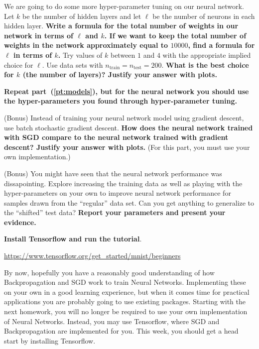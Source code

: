 \begin{Parts}
\Part We are going to do some more hyper-parameter tuning on our neural network. Let $k$ be the number of hidden layers and let $\ell$ be the number of neurons in each hidden layer. \textbf{Write a formula for the total number of weights in our network in terms of $\ell$ and $k$. If we want to keep the total number of weights in the network approximately equal to $10000$, find a formula for $\ell$ in terms of $k$.} Try values of $k$ between $1$ and $4$ with the appropriate implied choice for $\ell$. Use data sets with $n_\text{train}=n_\text{test}=200$. \textbf{What is the best choice for $k$ (the number of layers)? Justify your answer with plots.}



\Part \textbf{Repeat part~(\ref{pt:models}), but for the neural network you should use the hyper-parameters you found through hyper-parameter tuning.}



\Part (Bonus) Instead of training your neural network model using
gradient descent, use batch stochastic gradient descent. \textbf{How
  does the neural network trained with SGD compare to the neural
  network trained with gradient descent? Justify your answer with
  plots.} (For this part, you must use your own implementation.)

\Part (Bonus) You might have seen that the neural network performance
was dissapointing. Explore increasing the training data as well as
playing with the hyper-parameters on your own to improve neural
network performance for samples drawn from the ``regular'' data
set. Can you get anything to generalize to the ``shifted'' test data?
{\bf Report your parameters and present your evidence.}



\end{Parts} 

\textbf{Install Tensorflow and run the tutorial}.

\url{https://www.tensorflow.org/get_started/mnist/beginners}

By now, hopefully you have a reasonably good understanding of how Backpropagation and SGD work to train Neural Networks. Implementing these on your own in a good learning experience, but when it comes time for practical applications you are probably going to use existing packages. Starting with the next homework, you will no longer be required to use your own implementation of Neural Networks. Instead, you may use Tensorflow, where SGD and Backpropagation are implemented for you. This week, you should get a head start by installing Tensorflow.

